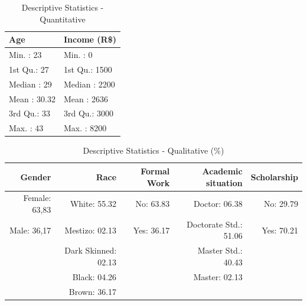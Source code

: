 \documentclass[12pt, english]{article}
\begin{document}
\begin{table}[ht]
	\centering
		\caption{Descriptive Statistics - Quantitative}
		\label{quanti}
	
	\begin{tabular}{p{4cm}p{4cm}}
			\hline
			Age & Income (R\$) \\ 
			\hline
			Min.   : 23   & Min.   :   0   \\ 
			1st Qu.: 27   & 1st Qu.: 1500   \\ 
			Median : 29   & Median : 2200   \\ 
			Mean   : 30.32 & Mean   : 2636   \\ 
			3rd Qu.: 33   & 3rd Qu.: 3000   \\ 
			Max.   : 43   & Max.   : 8200   \\ 
			\hline
		\end{tabular}
	
\end{table}


\begin{table}[ht]
		\small
		\centering
		\caption{Descriptive Statistics - Qualitative (\%)}
		\label{quali}
	
	\begin{tabular}{rrrrr}
			\hline
			Gender & Race & Formal Work & Academic situation & Scholarship \\ 
			\hline
			Female: 63,83   & White: 55.32   & No: 63.83  & Doctor: 06.38   & No: 29.79 \\ 
			Male: 36,17      & Mestizo: 02.13   & Yes: 36.17 & Doctorate Std.: 51.06  & Yes: 70.21 \\ 
			& Dark Skinned: 02.13   &  & Master Std.: 40.43 &  \\ 
			& Black: 04.26   &  & Master: 02.13 &  \\ 
			& Brown: 36.17   &  &  &  \\ 
			\hline
		\end{tabular}
	
	
\end{table}
\end{document}
